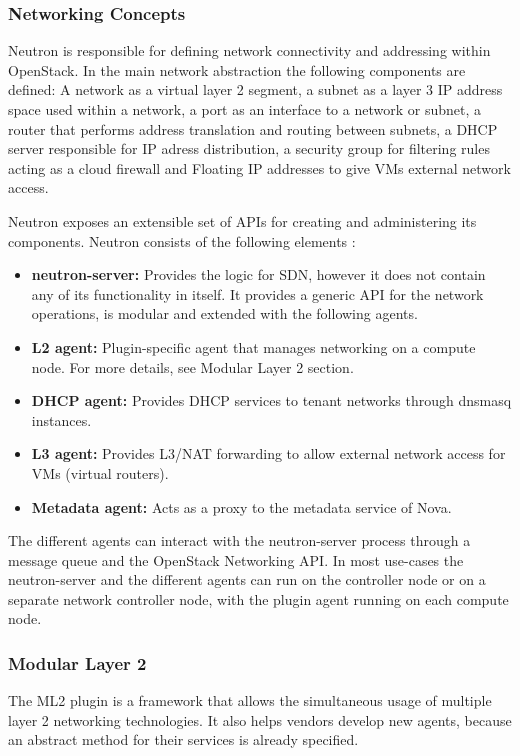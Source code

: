 \subsubsection{Networking Concepts}

Neutron is responsible for defining network connectivity and addressing within OpenStack. In the main network abstraction the following components are defined:
A network as a virtual layer 2 segment, a subnet as a layer 3 IP address space used within a network, a port as an interface to a network or subnet, a router that performs address translation and routing between subnets, a DHCP server responsible for IP adress distribution, a security group for filtering rules acting as a cloud firewall and Floating IP addresses to give VMs external network access.

Neutron exposes an extensible set of APIs for creating and administering its components. Neutron consists of the following elements \cite{openstack-training}:
\begin{itemize}
\item \textbf{neutron-server:} Provides the logic for SDN, however it does not contain any of its functionality in itself. It provides a generic API for the network operations, is modular and extended with the following agents.
\item \textbf{L2 agent:} Plugin-specific agent that manages networking on a compute node. For more details, see Modular Layer 2 section.
\item \textbf{DHCP agent:} Provides DHCP services to tenant networks through dnsmasq instances.
\item \textbf{L3 agent:} Provides L3/NAT forwarding to allow external network access for VMs (virtual routers).
\item \textbf{Metadata agent:} Acts as a proxy to the metadata service of Nova.
\end{itemize}

The different agents can interact with the neutron-server process through a message queue and the OpenStack Networking API. In most use-cases the neutron-server and the different agents can run on the controller node or on a separate network controller node, with the plugin agent running on each compute node.


\subsubsection{Modular Layer 2}

The ML2 plugin is a framework that allows the simultaneous usage of multiple layer 2 networking technologies. It also helps vendors develop new agents, because an abstract method for their services is already specified.

